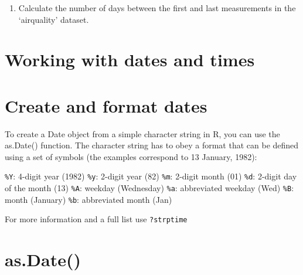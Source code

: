 \documentclass[
]{book}
\newenvironment{Shaded}{\begin{snugshade}}{\end{snugshade}}
\newcommand{\AttributeTok}[1]{\textcolor[rgb]{0.13,0.29,0.53}{#1}}
\newcommand{\CommentTok}[1]{\textcolor[rgb]{0.56,0.35,0.01}{\textit{#1}}}
\newcommand{\FunctionTok}[1]{\textcolor[rgb]{0.13,0.29,0.53}{\textbf{#1}}}
\newcommand{\NormalTok}[1]{#1}
\newcommand{\OtherTok}[1]{\textcolor[rgb]{0.56,0.35,0.01}{#1}}
\newcommand{\SpecialCharTok}[1]{\textcolor[rgb]{0.81,0.36,0.00}{\textbf{#1}}}
\newcommand{\StringTok}[1]{\textcolor[rgb]{0.31,0.60,0.02}{#1}}
\providecommand{\tightlist}{%
  \setlength{\itemsep}{0pt}\setlength{\parskip}{0pt}}
\begin{document}
\begin{enumerate}
\def\labelenumi{\arabic{enumi}.}
\setcounter{enumi}{1}
\tightlist
\item
  Calculate the number of days between the first and last measurements in the `airquality' dataset.
\end{enumerate}

\begin{Shaded}
\end{Shaded}

\section{Working with dates and times}\label{working-with-dates-and-times}

\section{Create and format dates}\label{create-and-format-dates-1}

To create a Date object from a simple character string in R, you can use the as.Date() function. The character string has to obey a format that can be defined using a set of symbols (the examples correspond to 13 January, 1982):

\texttt{\%Y}: 4-digit year (1982)
\texttt{\%y}: 2-digit year (82)
\texttt{\%m}: 2-digit month (01)
\texttt{\%d}: 2-digit day of the month (13)
\texttt{\%A}: weekday (Wednesday)
\texttt{\%a}: abbreviated weekday (Wed)
\texttt{\%B}: month (January)
\texttt{\%b}: abbreviated month (Jan)

For more information and a full list use \texttt{?strptime}

\section{as.Date()}\label{as.date}
\end{document}
